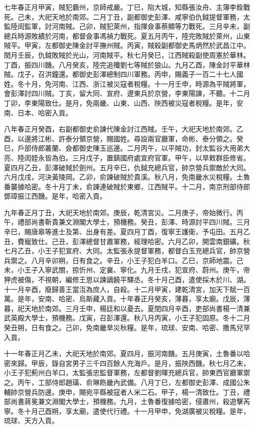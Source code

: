 \begin{pinyinscope}
七年春正月甲寅，賊犯霸州，京師戒嚴。丁巳，陷大城，知縣張汝舟、主簿李銓戰死。己未，大祀天地於南郊。二月丁丑，副都御史彭澤、咸寧伯仇鉞提督軍務，太監陸訚監軍，討河南賊。己卯，賊犯萊州，指揮僉事蔡顯等力戰死。三月辛未，副總兵時源敗績於河南，都督僉事馮禎力戰死。夏五月丙午，陸完敗賊於萊州，山東賊平。甲寅，左都御史陳金討平撫州賊。丙寅，賊殺副都御史馬炳然於武昌江中。閏月壬辰，仇鉞敗賊於光山，河南賊平。秋七月癸巳，江西賊殺副使周憲於華林。丁酉，振四川饑。八月癸亥，陸完追殲劉七等賊於狼山。九月乙酉，陳金討平華林賊。戊子，召洪鐘還。都御史彭澤總制四川軍務。丙申，賜義子一百二十七人國姓。冬十月，免河南、江西、浙江被災寇者稅糧。十一月壬申，時源為平賊將軍，會彭澤討四川賊。丁亥，留大同、宣府、遼東兵於京營，李東陽諫，不聽。十二月丁卯，李東陽致仕。是月，免兩畿、山東、山西、陜西被災寇者稅糧。是年，安南、日本、哈密入貢。

八年春正月癸酉，右副都御史俞諫代陳金討江西賊。壬午，大祀天地於南郊。乙酉，以邊將江彬、許泰分領京營，賜國姓。尋設兩官廳軍，命彬、泰分領之。癸巳，戶部侍郎叢蘭、僉都御史陳玉巡邊。二月丙午，以平賊功，封太監谷大用弟大亮、陸訚姪永皆為伯。三月戊子，置鎮國府處宣府官軍。甲午，以旱敕群臣修省。夏四月乙丑，彭澤破賊於劍州。五月辛巳，仇鉞充總兵官，帥京營兵禦敵於大同。六月戊戌，河決黃陵岡。乙卯，俞諫破賊於貴溪。秋八月，免南畿水災稅糧。土魯番襲據哈密。冬十月丁未，俞諫連破賊於東鄉，江西賊平。十二月，南京刑部侍郎鄧璋振江西饑。是年，哈密入貢。

九年春正月丁丑，大祀天地於南郊。庚辰，乾清宮災。二月庚子，帝始微行。丙午，禮部尚書靳貴兼文淵閣大學士，預機務。癸丑，彭澤、時源討平四川賊。三月辛巳，賜唐皋等進士及第、出身有差。夏四月丁酉，復寧王護衛，予屯田。五月乙丑，費寵致仕。己丑，彭澤總督甘肅軍務，經理哈密。六月乙卯，開雲南銀礦。秋七月乙丑，小王子犯宣府、大同。太監張永提督軍務，都督白玉充總兵官，帥京營兵禦之。八月辛卯朔，日有食之。辛丑，小王子犯白羊口。乙巳，京師地震。己未，小王子入寧武關，掠忻州、定襄、寧化。九月壬戌，犯宣府、蔚州。庚午，帝狎虎被傷，不視朝，編修王思以諫謫饒平驛丞。冬十月己酉，遣使採木於川、湖。十一月辛酉，廢歸善王當沍為庶人，自殺。十二月甲寅，建乾清宮，加天下賦一百萬。是年，安南、哈密、烏斯藏入貢。十年春正月癸亥，薄暮，享太廟。戊辰，薄暮，祀天地於南郊。三月壬申，楊廷和以憂去。夏閏四月辛酉，吏部尚書楊一清兼武英殿大學士，預機務。戊寅，召彭澤還。秋八月丙寅，小王子犯固原。冬十二月癸丑朔，日有食之。己卯，免南畿旱災秋糧。是年，琉球、安南、哈密、撒馬兒罕入貢。

十一年春正月乙未，大祀天地於南郊。夏四月，振河南饑。五月庚寅，土魯番以哈密來歸。甲辰，錄自宮男子三千四百餘人充海戶。是月，振陜西饑。秋七月乙未，小王子犯薊州白羊口，太監張忠監督軍務，左都督劉暉充總兵官，帥東西官廳軍禦之。丙午，工部侍郎趙璜、俞琳飭畿內武備。八月丁巳，左都御史彭澤、成國公朱輔帥京營兵防邊。庚申，賜宛平縣被寇者人米二石。甲子，楊一清致仕。丁丑，禮部尚書蔣冕兼文淵閣大學士，預機務。九月，土魯番復據哈密，侵肅州，殺遊擊芮寧。冬十月己酉朔，享太廟，遣使代行禮。十一月甲申，免湖廣被災稅糧。是年，琉球、天方入貢。


\end{pinyinscope}

